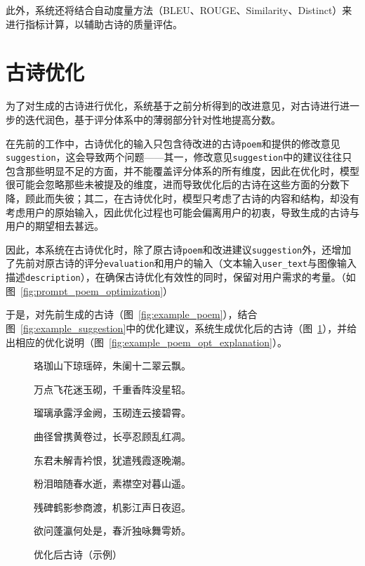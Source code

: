 此外，系统还将结合自动度量方法（BLEU、ROUGE、Similarity、Distinct）来进行指标计算，以辅助古诗的质量评估。

\section{古诗优化}

为了对生成的古诗进行优化，系统基于之前分析得到的改进意见，对古诗进行进一步的迭代润色，基于评分体系中的薄弱部分针对性地提高分数。

在先前的工作中，古诗优化的输入只包含待改进的古诗\verb|poem|和提供的修改意见\verb|suggestion|，这会导致两个问题——其一，修改意见\verb|suggestion|中的建议往往只包含那些明显不足的方面，并不能覆盖评分体系的所有维度，因此在优化时，模型很可能会忽略那些未被提及的维度，进而导致优化后的古诗在这些方面的分数下降，顾此而失彼；其二，在古诗优化时，模型只考虑了古诗的内容和结构，却没有考虑用户的原始输入，因此优化过程也可能会偏离用户的初衷，导致生成的古诗与用户的期望相去甚远。

因此，本系统在古诗优化时，除了原古诗\verb|poem|和改进建议\verb|suggestion|外，还增加了先前对原古诗的评分\verb|evaluation|和用户的输入（文本输入\verb|user_text|与图像输入描述\verb|description|），在确保古诗优化有效性的同时，保留对用户需求的考量。（如图~\ref{fig:prompt_poem_optimization}）

于是，对先前生成的古诗（图~\ref{fig:example_poem}），结合图~\ref{fig:example_suggestion}中的优化建议，系统生成优化后的古诗（图~\ref{fig:example_poem_optimized}），并给出相应的优化说明（图~\ref{fig:example_poem_opt_explanation}）。

\begin{figure}[ht]
  \centering
  \begin{tcolorbox}[
      colback=white,
      colframe=black,
      boxrule=1pt,
      arc=0mm,
      width=0.6\linewidth,  %
      ]
      \kaishu
      \centering
      珞珈山下琼瑶碎，朱阑十二翠云飘。\par
      万点飞花迷玉砌，千重香阵没星轺。\par
      瑠璃承露浮金阙，玉砌连云接碧霄。\par
      曲径曾携黄卷过，长亭忍顾乱红凋。\par
      东君未解青衿恨，犹遣残霞逐晚潮。\par
      粉泪暗随春水逝，素襟空对暮山遥。\par
      残碑鹤影参商渡，机影江声日夜迢。\par
      欲问蓬瀛何处是，春沂独咏舞雩娇。\par
  \end{tcolorbox}
  \caption{优化后古诗（示例）}
  \label{fig:example_poem_optimized}
\end{figure}

